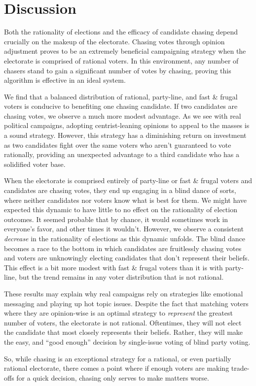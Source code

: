 \section{Discussion}
\label{sec:discussion}

Both the rationality of elections and the efficacy of candidate chasing depend
crucially on the makeup of the electorate. Chasing votes through opinion
adjustment proves to be an extremely beneficial campaigning strategy when the
electorate is comprised of rational voters. In this environment, any number of
chasers stand to gain a significant number of votes by chasing, proving this
algorithm is effective in an ideal system.

We find that a balanced distribution of rational, party-line, and fast \&
frugal voters is conducive to benefiting one chasing candidate. If two
candidates are chasing votes, we observe a much more modest advantage. As we
see with real political campaigns, adopting centrist-leaning opinions to appeal
to the masses is a sound strategy. However, this strategy has a diminishing
return on investment as two candidates fight over the same voters who aren't
guaranteed to vote rationally, providing an unexpected advantage to a third
candidate who has a solidified voter base.

When the electorate is comprised entirely of party-line or fast \& frugal
voters and candidates are chasing votes, they end up engaging in a blind dance
of sorts, where neither candidates nor voters know what is best for them. We
might have expected this dynamic to have little to no effect on the rationality
of election outcomes. It seemed probable that by chance, it would sometimes
work in everyone's favor, and other times it wouldn't. However, we observe a
consistent \textit{decrease} in the rationality of elections as this dynamic
unfolds. The blind dance becomes a race to the bottom in which candidates are
fruitlessly chasing votes and voters are unknowingly electing candidates that
don't represent their beliefs. This effect is a bit more modest with fast \&
frugal voters than it is with party-line, but the trend remains in any voter
distribution that is not rational.

These results may explain why real campaigns rely on strategies like emotional
messaging and playing up hot topic issues. Despite the fact that matching
voters where they are opinion-wise is an optimal strategy to \textit{represent}
the greatest number of voters, the electorate is not rational. Oftentimes, they
will not elect the candidate that most closely represents their beliefs.
Rather, they will make the easy, and ``good enough'' decision by single-issue
voting of blind party voting.

So, while chasing is an exceptional strategy for a rational, or even partially
rational electorate, there comes a point where if enough voters are making
trade-offs for a quick decision, chasing only serves to make matters worse. 

\pagebreak
